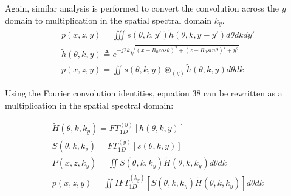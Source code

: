 \documentclass[conference]{IEEEtran}
\begin{document}
Again, similar analysis is performed to convert the convolution across the $y$ domain to multiplication in the spatial spectral domain $k_y$.
\begin{gather}
p(x,z,y) = \iiint s(\theta,k,y') \tilde{h}(\theta,k,y-y') d\theta dk dy' \\
\tilde{h}(\theta,k,y) \triangleq e^{-j2k\sqrt{(x - R_0cos\theta)^2 + (z - R_0sin\theta)^2 + y^2}} \\
p(x,z,y) = \iint s(\theta,k,y) \circledast_{(y)} \tilde{h}(\theta,k,y) d\theta dk
\end{gather}

Using the Fourier convolution identities, equation 38 can be rewritten as a multiplication in the spatial spectral domain:

\begin{gather}
\tilde{H}(\theta,k,k_y) = FT_{1D}^{(y)} [ h(\theta,k,y) ]\\
S(\theta,k,k_y) = FT_{1D}^{(y)} [ s(\theta,k,y) ]\\
P(x,z,k_y) = \iint S(\theta,k,k_y) \tilde{H}(\theta,k,k_y) d\theta dk \\
p(x,z,y) = \iint IFT_{1D}^{(k_y)}\left[S(\theta,k,k_y) \tilde{H}(\theta,k,k_y)\right] d\theta dk
\end{gather}
\end{document}
